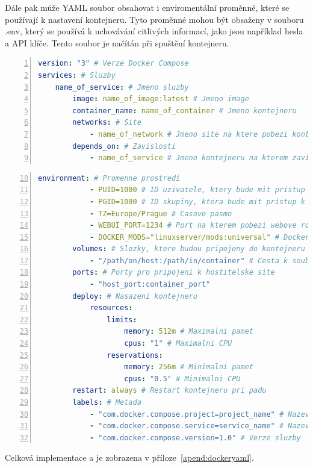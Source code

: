Dále pak může YAML soubor obsahovat i enviromentální proměnné, které se používají k nastavení kontejneru. Tyto proměnné mohou být obsaženy v souboru .env, který se používá k uchovávání citlivých informací, jako jsou například hesla a API klíče. Tento soubor je načítán při spuštění kontejneru. \cite{ENV}
\begin{lstlisting}[language=YAML, breaklines=true, numbers=left, numberstyle=\small, numbersep=10pt, frame=single, basicstyle=\ttfamily\small, caption=YAML soubor, label=lst:dockeryaml]
version: "3" # Verze Docker Compose
services: # Sluzby
    name_of_service: # Jmeno sluzby
        image: name_of_image:latest # Jmeno image
        container_name: name_of_container # Jmeno kontejneru
        networks: # Site
            - name_of_network # Jmeno site na ktere pobezi kontejner
        depends_on: # Zavislosti
            - name_of_service # Jmeno kontejneru na kterem zavisi
\end{lstlisting}
\pagebreak
\begin{lstlisting}[language=YAML, breaklines=true, numbers=left, firstnumber=10, numberstyle=\small, numbersep=10pt, frame=single, basicstyle=\ttfamily\small]
        environment: # Promenne prostredi
            - PUID=1000 # ID uzivatele, ktery bude mit pristup k souborum
            - PGID=1000 # ID skupiny, ktera bude mit pristup k souborum
            - TZ=Europe/Prague # Casove pasmo
            - WEBUI_PORT=1234 # Port na kterem pobezi webove rozhrani 
            - DOCKER_MODS="linuxserver/mods:universal" # Docker modifikace
        volumes: # Slozky, ktere budou pripojeny do kontejneru
            - "/path/on/host:/path/in/container" # Cesta k souborum
        ports: # Porty pro pripojeni k hostitelske site
            - "host_port:container_port"
        deploy: # Nasazeni kontejneru
            resources:
                limits:
                    memory: 512m # Maximalni pamet
                    cpus: "1" # Maximalni CPU
                reservations:
                    memory: 256m # Minimalni pamet
                    cpus: "0.5" # Minimalni CPU
        restart: always # Restart kontejneru pri padu
        labels: # Metada
            - "com.docker.compose.project=project_name" # Nazev projektu
            - "com.docker.compose.service=service_name" # Nazev sluzby
            - "com.docker.compose.version=1.0" # Verze sluzby
\end{lstlisting}
\noindent Celková implementace a je zobrazena v příloze~\ref{apend:dockeryaml}.
